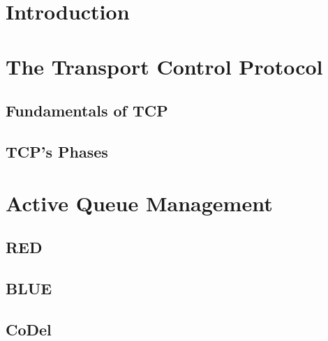 \documentclass[letter, 11pt]{article}
\theoremstyle{plain}
\theoremstyle{definition}
\begin{document}




\newpage

\tableofcontents
\listoffigures
\listoftables

\newpage

\doublespacing
\section{Introduction}
%

\newpage

%
\section{The Transport Control Protocol}


\subsection{Fundamentals of TCP}


\subsection{TCP's Phases }



\section{Active Queue Management}

\subsection{RED}

\subsection{BLUE}

\subsection{CoDel}

\end{document}
